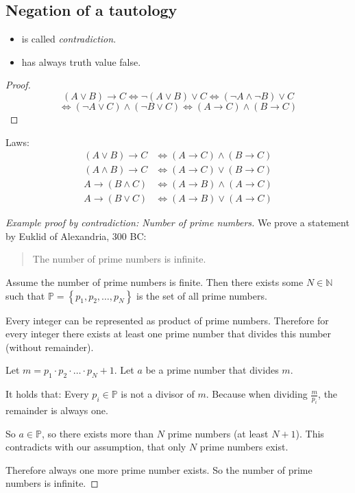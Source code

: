 \documentclass[a4paper,landscape,twocolumn]{article}
\theoremstyle{definition}
\newcommand\set[1]{\left\{#1\right\}}
\begin{document}
\subsection{Negation of a tautology}
\begin{itemize}
  \item is called \emph{contradiction}.
  \item has always truth value false.
\end{itemize}

\begin{proof}
  \[ (A \lor B) \to C \iff \neg (A \lor B) \lor C \iff (\neg A \land \neg B) \lor C \]
  \[ \iff (\neg A \lor C) \land (\neg B \lor C) \iff (A \to C) \land (B \to C) \]
\end{proof}

Laws:
\begin{align*}
  (A \lor B) \to C &\iff (A \to C) \land (B \to C) \\
  (A \land B) \to C &\iff (A \to C) \lor (B \to C) \\
  A \to (B \land C) &\iff (A \to B) \land (A \to C) \\
  A \to (B \lor C) &\iff (A \to B) \lor (A \to C)
\end{align*}

\begin{proof}[Example proof by contradiction: Number of prime numbers]
  We prove a statement by Euklid of Alexandria, 300 BC:
  \begin{quote}
    The number of prime numbers is infinite.
  \end{quote}

  Assume the number of prime numbers is finite.
  Then there exists some $N \in \mathbb N$ such that $\mathbb P = \set{p_1, p_2, \ldots, p_N}$
  is the set of all prime numbers.

  Every integer can be represented as product of prime numbers.
  Therefore for every integer there exists at least one prime number that divides this number (without remainder).

  Let $m = p_1 \cdot p_2 \cdot \ldots \cdot p_N + 1$.
  Let $a$ be a prime number that divides $m$.

  It holds that: Every $p_i \in \mathbb P$ is not a divisor of $m$.
  Because when dividing $\frac{m}{p_i}$, the remainder is always one.

  So $a \in \mathbb P$, so there exists more than $N$ prime numbers (at least $N+1$).
  This contradicts with our assumption, that only $N$ prime numbers exist.

  Therefore always one more prime number exists. So the number of prime numbers is infinite.
\end{proof}
\end{document}
